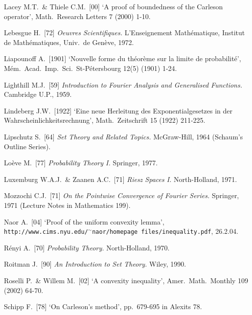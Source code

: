 {Lacey M.T.\ \& Thiele C.M.\ [00] `A proof of boundedness of the Carleson
operator', Math.\ Research Letters 7 (2000) 1-10.
\cmmnt{[\S286 {\it intro.}, 286H.]}

Lebesgue H.\ [72] {\it Oeuvres Scientifiques.}   L'Enseignement
Math\'ematique, Institut de Math\'ematiques, Univ.\ de Gen\`eve, 1972.

Liapounoff A.\ [1901] `Nouvelle forme du th\'eor\`eme sur la limite
de probabilit\'e', M\'em.\ Acad.\ Imp.\ Sci.\ St-P\'etersbourg 12(5)
(1901) 1-24. \cmmnt{[274Xh.]}

Lighthill M.J.\ [59] {\it Introduction to Fourier Analysis and
Generalised Functions.}  Cambridge U.P., 1959.
\cmmnt{[\S284 {\it notes}.]}

Lindeberg J.W.\ [1922] `Eine neue Herleitung des Exponentialgesetzes in
der Wahrscheinlichkeitsrechnung', Math.\ Zeitschrift 15 (1922) 211-225.
\cmmnt{[274H, \S274 {\it notes}.]}

Lipschutz S.\ [64] {\it Set Theory and Related Topics.}  McGraw-Hill,
1964 (Schaum's Outline Series).  \cmmnt{[\S2A1.]}

Lo\`eve M.\ [77] {\it Probability Theory I.} Springer, 1977.

Luxemburg W.A.J.\ \& Zaanen A.C.\ [71] {\it Riesz Spaces
I.} North-Holland, 1971.
\cmmnt{[241F.]}


\medskip%

Mozzochi C.J.\ [71] {\it On the Pointwise Convergence of Fourier
Series.}   Springer, 1971 (Lecture Notes in Mathematics 199).
\cmmnt{[\S286 {\it notes}.]}

\medskip%

Naor A.\ [04] `Proof of the uniform convexity lemma',
{\tt http://www.cims.nyu.edu/$^{\sim}$naor/homepage files/\ifnum{}\break\fi{\vthsp}inequality\discretionary{}{}{}.pdf},
26.2.04.
\cmmnt{[244O.]}

\medskip%

R\'enyi A.\ [70] {\it Probability Theory.}  North-Holland, 1970.
\cmmnt{[274H.]}

Roitman J.\ [90] {\it  An Introduction to Set Theory.}  Wiley, 1990.
\cmmnt{[\S2A1.]}

Roselli P.\ \& Willem M.\ [02] `A convexity inequality',
Amer.\ Math.\ Monthly 109 (2002) 64-70.
\cmmnt{[244Ym.]}

\medskip%

Schipp F.\ [78] `On Carleson's method', pp.\ 679-695 in
{\smc Alexits 78}.   \cmmnt{[\S286 {\it notes}.]}

}
